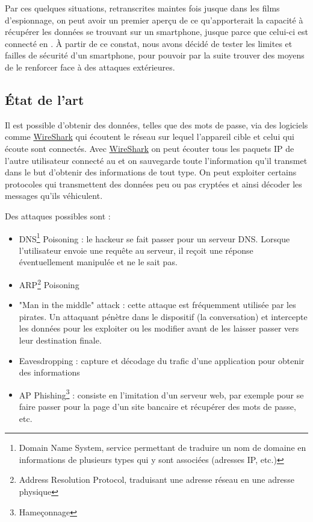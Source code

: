 \documentclass[a4paper, 12pt,twoside]{article}
\begin{document}
	Par ces quelques situations, retranscrites maintes fois jusque dans les films d'espionnage, on peut avoir un premier aperçu de ce qu'apporterait la capacité à récupérer les données se trouvant sur un smartphone, jusque parce que celui-ci est connecté en \wifi{}. À partir de ce constat, nous avons décidé de tester les limites et failles de sécurité d'un smartphone, pour pouvoir par la suite trouver des moyens de le renforcer face à des attaques extérieures.
		
	\subsection{État de l'art}
	
	Il est possible d'obtenir des données, telles que des mots de passe, via des logiciels comme \newcommand{\wireshark}{\href{https://www.wireshark.org}{WireShark}} \wireshark{} qui écoutent le réseau \wifi{} sur lequel l'appareil cible et celui qui écoute sont connectés. Avec \wireshark{} on peut écouter tous les paquets IP de l'autre utilisateur connecté au \wifi{} et on sauvegarde toute l'information qu'il transmet dans le but d'obtenir des informations de tout type. On peut exploiter certains protocoles qui transmettent des données peu ou pas cryptées et ainsi décoder les messages qu'ils véhiculent.\pagebreak[4]
	
	Des attaques possibles sont :\nopagebreak[4]
	
	\begin{itemize}\setlength{\parskip}{0pt}
		\item DNS\footnote{Domain Name System, service permettant de traduire un nom de domaine en informations de plusieurs types qui y sont associées (adresses IP, etc.)} Poisoning : le hackeur se fait passer pour un serveur DNS. Lorsque l'utilisateur envoie une requête au serveur, il reçoit une réponse éventuellement manipulée et ne le sait pas. 
		\item ARP\footnote{Address Resolution Protocol, traduisant une adresse réseau en une adresse physique} Poisoning
		\item "Man in the middle" attack : cette attaque est fréquemment utilisée par les pirates. Un attaquant pénètre dans le dispositif (la conversation) et intercepte les données pour les exploiter ou les modifier avant de les laisser passer vers leur destination finale.
		\item Eavesdropping : capture et décodage du trafic d'une application pour obtenir des informations
		\item AP Phishing\footnote{Hameçonnage} : consiste en l'imitation d'un serveur web, par exemple pour se faire passer pour la page d'un site bancaire et récupérer des mots de passe, etc.
	\end{itemize}
\end{document}
